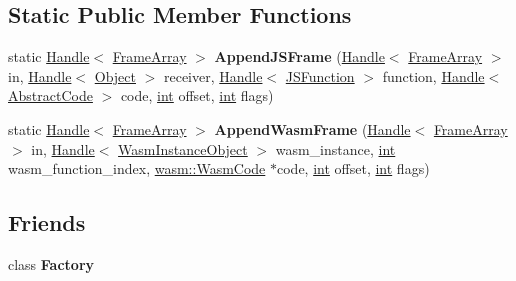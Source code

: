 \subsection*{Static Public Member Functions}
\begin{DoxyCompactItemize}
\item 
\mbox{\label{classv8_1_1internal_1_1FrameArray_a3447f2336aa30a7835ee20c6d4e7a8a9}} 
static \mbox{\hyperlink{classv8_1_1internal_1_1Handle}{Handle}}$<$ \mbox{\hyperlink{classv8_1_1internal_1_1FrameArray}{Frame\+Array}} $>$ {\bfseries Append\+J\+S\+Frame} (\mbox{\hyperlink{classv8_1_1internal_1_1Handle}{Handle}}$<$ \mbox{\hyperlink{classv8_1_1internal_1_1FrameArray}{Frame\+Array}} $>$ in, \mbox{\hyperlink{classv8_1_1internal_1_1Handle}{Handle}}$<$ \mbox{\hyperlink{classv8_1_1internal_1_1Object}{Object}} $>$ receiver, \mbox{\hyperlink{classv8_1_1internal_1_1Handle}{Handle}}$<$ \mbox{\hyperlink{classv8_1_1internal_1_1JSFunction}{J\+S\+Function}} $>$ function, \mbox{\hyperlink{classv8_1_1internal_1_1Handle}{Handle}}$<$ \mbox{\hyperlink{classv8_1_1internal_1_1AbstractCode}{Abstract\+Code}} $>$ code, \mbox{\hyperlink{classint}{int}} offset, \mbox{\hyperlink{classint}{int}} flags)
\item 
\mbox{\label{classv8_1_1internal_1_1FrameArray_a0172baa6760b4778d568666822e245b3}} 
static \mbox{\hyperlink{classv8_1_1internal_1_1Handle}{Handle}}$<$ \mbox{\hyperlink{classv8_1_1internal_1_1FrameArray}{Frame\+Array}} $>$ {\bfseries Append\+Wasm\+Frame} (\mbox{\hyperlink{classv8_1_1internal_1_1Handle}{Handle}}$<$ \mbox{\hyperlink{classv8_1_1internal_1_1FrameArray}{Frame\+Array}} $>$ in, \mbox{\hyperlink{classv8_1_1internal_1_1Handle}{Handle}}$<$ \mbox{\hyperlink{classv8_1_1internal_1_1WasmInstanceObject}{Wasm\+Instance\+Object}} $>$ wasm\+\_\+instance, \mbox{\hyperlink{classint}{int}} wasm\+\_\+function\+\_\+index, \mbox{\hyperlink{classv8_1_1internal_1_1wasm_1_1WasmCode}{wasm\+::\+Wasm\+Code}} $\ast$code, \mbox{\hyperlink{classint}{int}} offset, \mbox{\hyperlink{classint}{int}} flags)
\end{DoxyCompactItemize}
\subsection*{Friends}
\begin{DoxyCompactItemize}
\item 
\mbox{\label{classv8_1_1internal_1_1FrameArray_a328c093d609680cca505905c6d49901a}} 
class {\bfseries Factory}
\end{DoxyCompactItemize}
